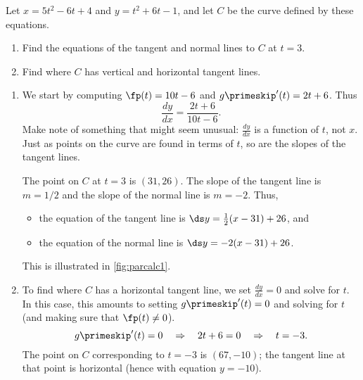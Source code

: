 \begin{example}\label{ex_parcalc1}
Let $x=5t^2-6t+4$ and $y=t^2+6t-1$, and let $C$ be the curve defined by these equations.
\begin{enumerate}
	\item	Find the equations of the tangent and normal lines to $C$ at $t=3$.
	\item	Find where $C$ has vertical and horizontal tangent lines.
\end{enumerate}
\solution
\begin{enumerate}
	\item We start by computing $\fp(t) = 10t-6$ and $g\primeskip'(t) =2t+6$. Thus \[\frac{dy}{dx} = \frac{2t+6}{10t-6}.\]
	Make note of something that might seem unusual: $\frac{dy}{dx}$ is a function of $t$, not $x$. Just as points on the curve are found in terms of $t$, so are the slopes of the tangent lines.

	The point on $C$ at $t=3$ is $(31,26)$. The slope of the tangent line is $m=1/2$ and the slope of the normal line is $m=-2$. Thus,
	\begin{itemize}
		\item the equation of the tangent line is $\ds y=\frac12(x-31)+26$, and
		\item	the equation of the normal line is $\ds y=-2(x-31)+26$.
	\end{itemize}
	This is illustrated in \autoref{fig:parcalc1}.


	\item	To find where $C$ has a horizontal tangent line, we set $\frac{dy}{dx}=0$ and solve for $t$. In this case, this amounts to setting $g\primeskip'(t)=0$ and solving for $t$ (and making sure that $\fp(t)\neq 0$). 
\[g\primeskip'(t)=0 \quad \Rightarrow \quad 2t+6=0 \quad \Rightarrow \quad t=-3.\]
	The point on $C$ corresponding to $t=-3$ is $(67,-10)$; the tangent line at that point is horizontal (hence with equation $y=-10$).
		

\end{enumerate}
\end{example}
